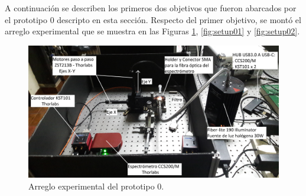 A continuación se describen los primeros dos objetivos que fueron abarcados por el prototipo 0 descripto en esta sección. Respecto del primer objetivo, se montó el arreglo experimental que se muestra en las Figuras \ref{fig:setup0}, \ref{fig:setup01} y \ref{fig:setup02}. 

\begin{figure}[H]
	\centering
	\includegraphics[width=1.0\textwidth]{Figs/microespectrometro/setupbarridooriginal.jpg}
	\caption{Arreglo experimental del prototipo 0.}
	\label{fig:setup0}
\end{figure}

